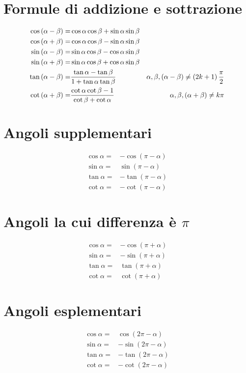 \section{Formule di addizione e sottrazione}
\begin{align*}
\cos\left(\alpha-\beta\right)=&{}\cos\alpha\cos\beta+\sin\alpha\sin\beta\\\index{Coseno!differenza!angoli}
\cos\left(\alpha+\beta\right)=&{}\cos\alpha\cos\beta-\sin\alpha\sin\beta\\\index{Coseno!somma!angoli}
\sin\left(\alpha-\beta\right)=&{}\sin\alpha\cos\beta-\cos\alpha\sin\beta\\\index{Seno!differenza angoli}
\sin\left(\alpha+\beta\right)=&{}\sin\alpha\cos\beta+\cos\alpha\sin\beta\\\index{Seno!somma!angoli}
\tan\left(\alpha-\beta\right)=&{}\dfrac{\tan\alpha-\tan\beta}{1+\tan\alpha\tan\beta} &\alpha,\beta,\left(\alpha-\beta\right)\neq\left(2k+1\right)\dfrac{\pi}{2}\\\index{Tangente!differenza!angoli}
\cot\left(\alpha+\beta\right)=&{}\dfrac{\cot\alpha\cot\beta-1}{\cot\beta+\cot\alpha}
&\alpha,\beta,\left(\alpha+\beta\right)\neq k\pi\index{Cotangente!somma!angoli}
\end{align*}
\section{Angoli supplementari}
\begin{align*}
\cos\alpha=&-\cos(\pi-\alpha)\\
\sin\alpha=&\sin(\pi-\alpha)\\
\tan\alpha=&-\tan(\pi-\alpha)\\
\cot\alpha=&-\cot(\pi-\alpha)
\end{align*}
\section{Angoli la cui differenza è \texorpdfstring{$\pi$}{\textpi}}
\begin{align*}
\cos\alpha=&-\cos(\pi+\alpha)\\
\sin\alpha=&-\sin(\pi+\alpha)\\
\tan\alpha=&\tan(\pi+\alpha)\\
\cot\alpha=&\cot(\pi+\alpha)
\end{align*}
\section{Angoli esplementari}
\begin{align*}
\cos\alpha=&\cos(2\pi-\alpha)\\
\sin\alpha=&-\sin(2\pi-\alpha)\\
\tan\alpha=&-\tan(2\pi-\alpha)\\
\cot\alpha=&-\cot(2\pi-\alpha)
\end{align*}

